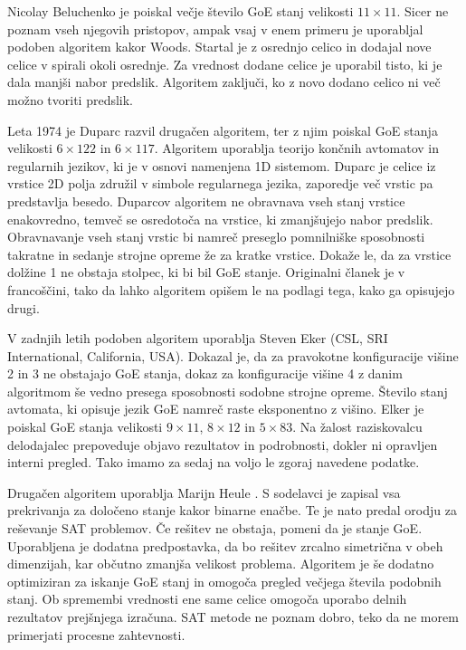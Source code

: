 \documentclass[12pt,a4paper,openany,twoside]{book}
\begin{document}
Nicolay Beluchenko je poiskal večje število GoE stanj velikosti \(11 \times 11\).
Sicer ne poznam vseh njegovih pristopov, ampak vsaj v enem primeru je uporabljal
podoben algoritem kakor Woods. Startal je z osrednjo celico in dodajal nove celice
v spirali okoli osrednje. Za vrednost dodane celice je uporabil tisto, ki je dala manjši nabor predslik.
Algoritem zaključi, ko z novo dodano celico ni več možno tvoriti predslik.

Leta 1974 je Duparc \cite{Duparc1972, Duparc1974} razvil drugačen algoritem,
ter z njim poiskal GoE stanja velikosti \(6 \times 122\) in \(6 \times 117\).
Algoritem uporablja teorijo končnih avtomatov in regularnih jezikov, ki je v
osnovi namenjena 1D sistemom.
Duparc je celice iz vrstice 2D polja združil v simbole regularnega jezika,
zaporedje več vrstic pa predstavlja besedo.
Duparcov algoritem ne obravnava vseh stanj vrstice enakovredno,
temveč se osredotoča na vrstice, ki zmanjšujejo nabor predslik.
Obravnavanje vseh stanj vrstic bi namreč preseglo pomnilniške sposobnosti
takratne in sedanje strojne opreme že za kratke vrstice.
Dokaže le, da za vrstice dolžine 1 ne obstaja stolpec, ki bi bil GoE stanje.
Originalni članek je v francoščini, tako da lahko algoritem opišem le na podlagi tega, kako ga opisujejo drugi.

V zadnjih letih podoben algoritem uporablja Steven Eker (CSL, SRI International, California, USA).
Dokazal je, da za pravokotne konfiguracije višine 2 in 3 ne obstajajo GoE stanja,
dokaz za konfiguracije višine 4 z danim algoritmom še vedno presega sposobnosti sodobne strojne opreme.
Število stanj avtomata, ki opisuje jezik GoE namreč raste eksponentno z višino.
Elker je poiskal GoE stanja velikosti \(9 \times 11\), \(8 \times 12\) in \(5 \times 83\).
Na žalost raziskovalcu delodajalec prepoveduje objavo rezultatov in podrobnosti, dokler ni opravljen interni pregled.
Tako imamo za sedaj na voljo le zgoraj navedene podatke.

Drugačen algoritem uporablja Marijn Heule \cite{Hartman2013}.
S sodelavci je zapisal vsa prekrivanja za določeno stanje kakor binarne enačbe.
Te je nato predal orodju za reševanje SAT problemov.
Če rešitev ne obstaja, pomeni da je stanje GoE.
Uporabljena je dodatna predpostavka, da bo rešitev zrcalno simetrična v obeh dimenzijah,
kar občutno zmanjša velikost problema.
Algoritem je še dodatno optimiziran za iskanje GoE stanj in
omogoča pregled večjega števila podobnih stanj.
Ob spremembi vrednosti ene same celice omogoča uporabo delnih rezultatov prejšnjega izračuna.
SAT metode ne poznam dobro, teko da ne morem primerjati procesne zahtevnosti.
\end{document}
